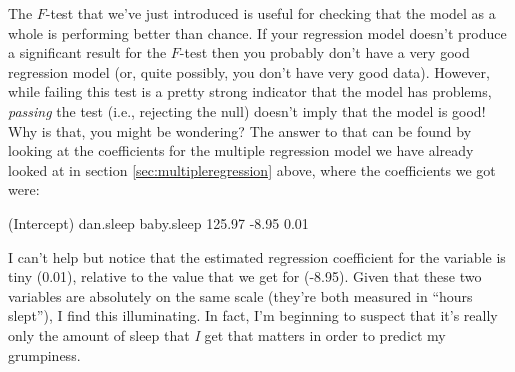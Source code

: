 The $F$-test that we've just introduced is useful for checking that the model as a whole is performing better than chance. If your regression model doesn't produce a significant result for the $F$-test then you probably don't have a very good regression model (or, quite possibly, you don't have very good data). However, while failing this test is a pretty strong indicator that the model has problems, {\it passing} the test (i.e., rejecting the null) doesn't imply that the model is good! Why is that, you might be wondering? The answer to that can be found by looking at the coefficients for the multiple regression model we have already looked at in section \ref{sec:multipleregression} above, where the coefficients we got were:

\begin{rblock1}
(Intercept)    dan.sleep   baby.sleep  
  125.97        -8.95        0.01  
\end{rblock1}

I can't help but notice that the estimated regression coefficient for the  variable is tiny (0.01), relative to the value that we get for  (-8.95). Given that these two variables are absolutely on the same scale (they're both measured in ``hours slept''), I find this illuminating. In fact, I'm beginning to suspect that it's really only the amount of sleep that {\it I} get that matters in order to predict my grumpiness.

